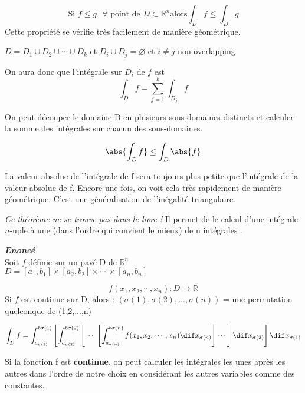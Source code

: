 \begin{myprop}
$$\text{Si } f \le  g  \text{ } \forall \text{ point de }D\subset \mathbb{R}^n \text{alors} \int_D f \le \int_D g $$
Cette propriété se vérifie très facilement de manière géométrique.
\end{myprop}

\begin{myprop}
$D= D_1 \cup D_2 \cup \cdots \cup D_k$ et $D_i \cup D_j = \varnothing$ et $i\neq j$ non-overlapping

On aura donc que l'intégrale sur $D_i$ de $f$ est
\[\int_D f=\sum_{j=1}^k \int_{D_j} f\]

On peut découper le domaine D en plusieurs sous-domaines distincts et calculer la somme des intégrales sur chacun des sous-domaines.
\end{myprop}

\begin{myprop}
\[\abs{\int_D f} \le \int_D\abs{f}\]

La valeur absolue de l'intégrale de f sera toujours plus petite que l'intégrale de la valeur absolue de f. Encore une fois, on voit cela très rapidement de manière géométrique. C'est une généralisation de l'inégalité triangulaire.
\end{myprop}

\begin{myprop}
\emph{Ce théorème ne se trouve pas dans le livre !}
Il permet de  le calcul d'une intégrale $n$-uple à une  (dans l'ordre qui convient le mieux) de n intégrales .

\textit{\textbf{Enoncé}} \\Soit $f$ définie sur un pavé D de $\mathbb{R}^n$\\
$D=[a_1,b_1]\times[a_2,b_2]\times \cdots\ \times[a_n,b_n]$

\[f(x_1,x_2,\cdots,x_n) : D\to\mathbb{R}\]
Si $f$ est continue sur D, alors : $(\sigma(1),\sigma(2),...,\sigma(n)) $ = une permutation quelconque de (1,2,...,n)

$$
\int_D f= \int_{a_{\sigma(1)}}^{b{\sigma(1)}}
\left[
\int_{a_{\sigma(2)}}^{b{\sigma(2)}}
\left[ \cdots\ \left[
\int_{a_{\sigma(n)}}^{b{\sigma(n)}}
f(x_1,x_2,\cdots,x_n )\dif x_{\sigma(n)}
\right]\cdots\right]
\dif x_{\sigma(2)} \right] \dif x_{\sigma(1)}
$$

Si la fonction f est \textbf{continue}, on peut calculer les intégrales les unes après les autres dans l'ordre de notre choix en considérant les autres variables comme des constantes.
\end{myprop}




